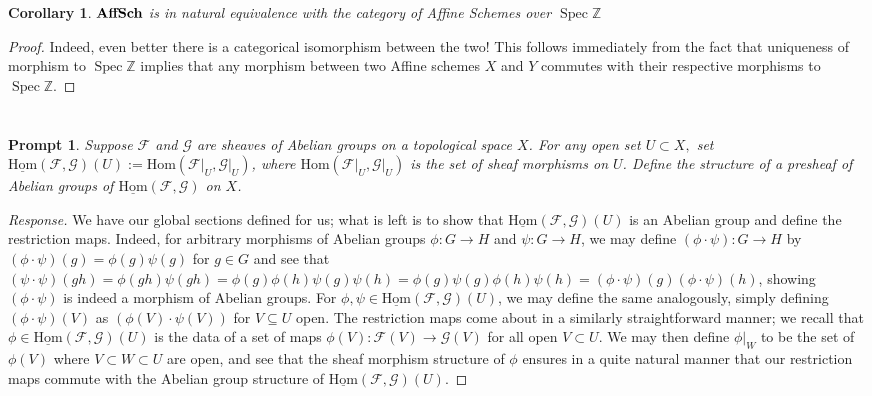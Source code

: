 \documentclass[english]{article}
\newcommand{\evat}[3]{\left. #1\right|_{#2}^{#3}}
\DeclareMathOperator{\spec}{Spec}
\newcommand{\ZZ}{\mathbb{Z}}
\newcommand{\FF}{\mathscr{F}}
\newcommand{\GG}{\mathscr{G}}
\newcommand{\prob}[1]{\setcounter{section}{#1-1}\section{}}
\newtheorem{corollary}[theorem]{Corollary}
\newtheorem*{prompt*}{Prompt}
\theoremstyle{remark}
\theoremstyle{definition}
\renewcommand{\hom}{\mathrm{Hom}}
\newcommand{\cat}[1]{{\mathrm{\bf{#1}}}}
\newcommand{\restr}[2]{\evat{#1}{#2}{}}
\newcommand{\imp}[1]{\underline{#1}}
\newcommand{\ihm}{\imp{\hom}}
\newcommand{\him}{\ihm(\FF,\GG)}
\begin{document}
\begin{corollary}
	$\cat{AffSch}$ is in natural equivalence with the category of Affine Schemes over $\spec \ZZ$
\end{corollary}
\begin{proof}
	Indeed, even better there is a categorical isomorphism between the two! This follows immediately from the fact that uniqueness of morphism to $\spec \ZZ$ implies that any morphism between two Affine schemes $X$ and $Y$ commutes with their respective morphisms to $\spec{\ZZ}$.
\end{proof}
\prob{3}
\prob{4}\begin{prompt*}
	Suppose $\FF$ and $\GG$ are sheaves of Abelian groups on a topological space $X$. For any open set $U \subset X,$ set
	$\ihm(\FF, \GG)(U) := \hom(\restr{\FF}{U} , \restr{\GG}{U} )$,
	where $\hom(\restr{\FF}{U} , \restr{\GG}{U} )$ is the set of sheaf morphisms on $ U$. Define the structure of
	a presheaf of Abelian groups of $\ihm(\FF,\GG)$ on $X$.
\end{prompt*}\begin{proof}[Response]
We have our global sections defined for us; what is left is to show that $\him(U)$ is an Abelian group and define the restriction maps. Indeed, for arbitrary morphisms of Abelian groups $\phi:G\to H$ and $\psi:G\to H$, we may define $(\phi\cdot \psi):G\to H$ by $(\phi\cdot \psi)(g)=\phi(g)\psi(g)$ for $g\in G$ and see that $(\psi\cdot \psi)(gh)=\phi(gh)\psi(gh)=\phi(g)\phi(h)\psi(g)\psi(h)=\phi(g)\psi(g)\phi(h)\psi(h)=(\phi\cdot\psi)(g)(\phi\cdot\psi)(h)$, showing $(\phi\cdot\psi)$ is indeed a morphism of Abelian groups. For $\phi,\psi\in \him(U)$, we may define the same analogously, simply defining $(\phi\cdot\psi)(V)$ as $(\phi(V)\cdot\psi(V))$ for $V\subseteq U$ open. The restriction maps come about in a similarly straightforward manner; we recall that $\phi\in \him(U)$ is the data of a set of maps $\phi(V):\FF(V)\to \GG(V)$ for all open $V\subset U$. We may then define $\restr{\phi}{W}$ to be the set of $\phi(V)$ where $V\subset W\subset U$ are open, and see that the sheaf morphism structure of $\phi$ ensures in a quite natural manner that our restriction maps commute with the Abelian group structure of $\him(U)$.
\end{proof}
\end{document}
